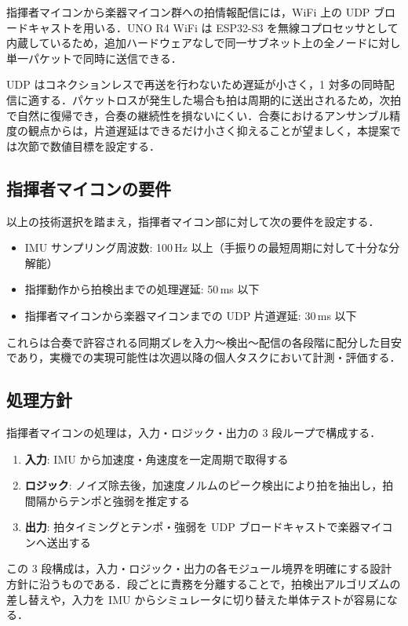 指揮者マイコンから楽器マイコン群への拍情報配信には，WiFi 上の UDP ブロードキャストを用いる．UNO R4 WiFi は ESP32-S3 を無線コプロセッサとして内蔵しているため，追加ハードウェアなしで同一サブネット上の全ノードに対し単一パケットで同時に送信できる．

UDP はコネクションレスで再送を行わないため遅延が小さく，1 対多の同時配信に適する．パケットロスが発生した場合も拍は周期的に送出されるため，次拍で自然に復帰でき，合奏の継続性を損ないにくい．合奏におけるアンサンブル精度の観点からは，片道遅延はできるだけ小さく抑えることが望ましく，本提案では次節で数値目標を設定する．

\subsection{指揮者マイコンの要件}
\label{subsec:requirements}

以上の技術選択を踏まえ，指揮者マイコン部に対して次の要件を設定する．

\begin{itemize}
  \item IMU サンプリング周波数: 100\,Hz 以上（手振りの最短周期に対して十分な分解能）
  \item 指揮動作から拍検出までの処理遅延: 50\,ms 以下
  \item 指揮者マイコンから楽器マイコンまでの UDP 片道遅延: 30\,ms 以下
\end{itemize}

これらは合奏で許容される同期ズレを入力〜検出〜配信の各段階に配分した目安であり，実機での実現可能性は次週以降の個人タスクにおいて計測・評価する．

\subsection{処理方針}
\label{subsec:processing}

指揮者マイコンの処理は，入力・ロジック・出力の 3 段ループで構成する．

\begin{enumerate}
  \item \textbf{入力}: IMU から加速度・角速度を一定周期で取得する
  \item \textbf{ロジック}: ノイズ除去後，加速度ノルムのピーク検出により拍を抽出し，拍間隔からテンポと強弱を推定する
  \item \textbf{出力}: 拍タイミングとテンポ・強弱を UDP ブロードキャストで楽器マイコンへ送出する
\end{enumerate}

この 3 段構成は，入力・ロジック・出力の各モジュール境界を明確にする設計方針に沿うものである．段ごとに責務を分離することで，拍検出アルゴリズムの差し替えや，入力を IMU からシミュレータに切り替えた単体テストが容易になる．
